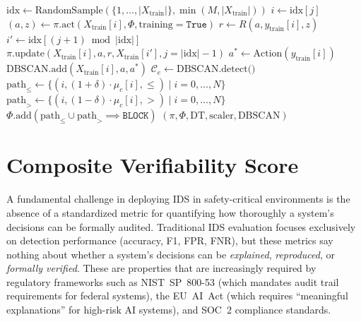 \documentclass[12pt, letterpaper, oneside]{report}
\begin{document}
\begin{algorithm}[htbp]
\begin{algorithmic}[1]
\State {}
    \State $\text{idx} \leftarrow \text{RandomSample}(\{1,\ldots,|X_{\text{train}}|\}, \min(M, |X_{\text{train}}|))$
        \State $i \leftarrow \text{idx}[j]$
        \State $(a, z) \leftarrow \pi.\text{act}(X_{\text{train}}[i], \Phi, \text{training}=\texttt{True})$ 
        \State $r \leftarrow R(a, y_{\text{train}}[i], z)$ 
        \State $i' \leftarrow \text{idx}[(j+1) \bmod |\text{idx}|]$
        \State $\pi.\text{update}(X_{\text{train}}[i], a, r, X_{\text{train}}[i'], j = |\text{idx}|-1)$ 
        \State $a^* \leftarrow \text{Action}(y_{\text{train}}[i])$ 
        \State $\text{DBSCAN.add}(X_{\text{train}}[i], a, a^*)$
    \EndFor
     
        \State $\mathcal{C}_e \leftarrow \text{DBSCAN.detect()}$ 
            \State $\text{path}_{\leq} \leftarrow \{(i, (1+\delta) \cdot \mu_c[i], \leq) \mid i = 0,\ldots,N\}$
            \State $\text{path}_{>} \leftarrow \{(i, (1-\delta) \cdot \mu_c[i], >) \mid i = 0,\ldots,N\}$
            \State $\Phi.\text{add}(\text{path}_{\leq} \cup \text{path}_{>} \implies \texttt{BLOCK})$
        \EndFor
    \EndIf
\EndFor
\State \Return $(\pi, \Phi, \text{DT}, \text{scaler}, \text{DBSCAN})$
\end{algorithmic}
\end{algorithm}


\section{Composite Verifiability Score}
\label{sec:cvs}

A fundamental challenge in deploying IDS in safety-critical environments is the absence of a standardized metric for quantifying how thoroughly a system's decisions can be formally audited. Traditional IDS evaluation focuses exclusively on detection performance (accuracy, F1, FPR, FNR), but these metrics say nothing about whether a system's decisions can be \emph{explained}, \emph{reproduced}, or \emph{formally verified}. These are properties that are increasingly required by regulatory frameworks such as NIST~SP~800-53 (which mandates audit trail requirements for federal systems), the EU~AI~Act (which requires ``meaningful explanations'' for high-risk AI systems), and SOC~2 compliance standards.
\end{document}
